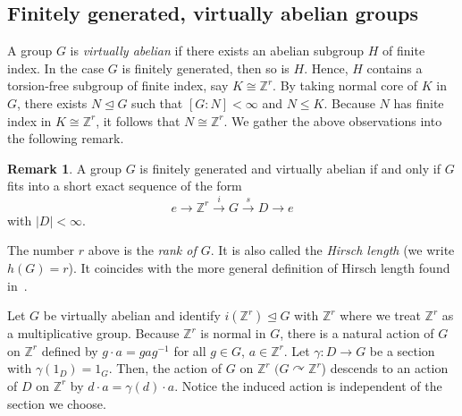 \documentclass{amsart}
\theoremstyle{definition}
\newtheorem{remark}[theorem]{Remark}
\newcommand{\Z}{\mathbb{Z}}
\begin{document}
\subsection{Finitely generated, virtually abelian groups} 
A group $G$ is \emph{virtually abelian} if there exists an abelian subgroup $H$ of finite index. In the case $G$ is finitely generated, then so is $H$. Hence, $H$ contains a torsion-free subgroup of finite index, say $K\cong\Z^r$. By taking normal core of $K$ in $G$, there exists $N\unlhd G$ such that $[G:N]<\infty$ and $N\leq K$. Because $N$ has finite index in $K\cong \Z^r$, it follows that $N\cong \Z^r$. We gather the above observations into the following remark.
\begin{remark}\label{virtually_abelian_general_form}
    A group $G$ is finitely generated and virtually abelian if and only if $G$ fits into a short exact sequence of the form
    \begin{equation}\label{eqn:virtually_abelian_defn}
         e\rightarrow \Z^r\stackrel{i}{\rightarrow} G\stackrel{s}{\rightarrow}D\rightarrow e
    \end{equation}
    with $|D|<\infty$. 
\end{remark}

The number $r$ above is the {\em rank of $G$}. It is also called the \emph{Hirsch length} (we write $h(G)=r$). It coincides with the more general definition of Hirsch length found in~\cite{hillman_finite_Hirsch_length_old}. \par
Let $G$ be virtually abelian and identify $i(\Z^r)\unlhd  G$ with $\Z^r$ where we treat $\Z^r$ as a multiplicative group. Because $\Z^r$ is normal in $G$, there is a natural action of $G$ on $\Z^r$ defined by $g\cdot a=gag^{-1}$ for all $g\in G$, $a\in \Z^r$. Let $\gamma \colon D\rightarrow G$ be a section with $\gamma(1_D)=1_G$. Then, the action of $G$ on $\Z^r$ $(G\curvearrowright \Z^r$) descends to an action of $D$ on $\Z^r$ by $d\cdot a=\gamma(d)\cdot a$. Notice the induced action is independent of the section we choose. 
\end{document}
